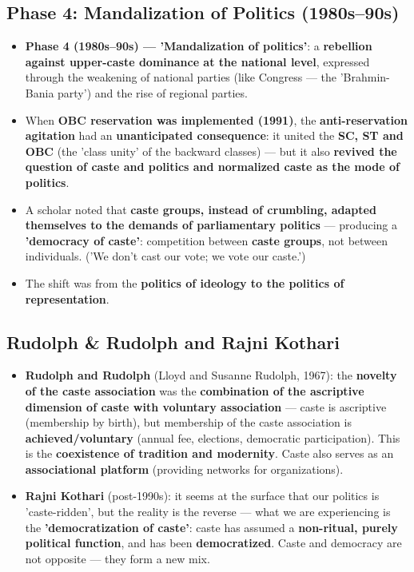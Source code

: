\subsection{Phase 4: Mandalization of Politics (1980s--90s)}

\begin{KeyConcept}
\begin{itemize}
\item \textbf{Phase 4 (1980s--90s) --- 'Mandalization of politics'}: a \textbf{rebellion against upper-caste dominance at the national level}, expressed through the weakening of national parties (like Congress --- the 'Brahmin-Bania party') and the rise of regional parties.
\item When \textbf{OBC reservation was implemented (1991)}, the \textbf{anti-reservation agitation} had an \textbf{unanticipated consequence}: it united the \textbf{SC, ST and OBC} (the 'class unity' of the backward classes) --- but it also \textbf{revived the question of caste and politics and normalized caste as the mode of politics}.
\item A scholar noted that \textbf{caste groups, instead of crumbling, adapted themselves to the demands of parliamentary politics} --- producing a \textbf{'democracy of caste'}: competition between \textbf{caste groups}, not between individuals. ('We don't cast our vote; we vote our caste.')
\item The shift was from the \textbf{politics of ideology to the politics of representation}.
\end{itemize}
\end{KeyConcept}

\subsection{Rudolph \& Rudolph and Rajni Kothari}

\begin{KeyConcept}
\begin{itemize}
\item \textbf{Rudolph and Rudolph} (Lloyd and Susanne Rudolph, 1967): the \textbf{novelty of the caste association} was the \textbf{combination of the ascriptive dimension of caste with voluntary association} --- caste is ascriptive (membership by birth), but membership of the caste association is \textbf{achieved/voluntary} (annual fee, elections, democratic participation). This is the \textbf{coexistence of tradition and modernity}. Caste also serves as an \textbf{associational platform} (providing networks for organizations).
\item \textbf{Rajni Kothari} (post-1990s): it seems at the surface that our politics is 'caste-ridden', but the reality is the reverse --- what we are experiencing is the \textbf{'democratization of caste'}: caste has assumed a \textbf{non-ritual, purely political function}, and has been \textbf{democratized}. Caste and democracy are not opposite --- they form a new mix.
\end{itemize}
\end{KeyConcept}


